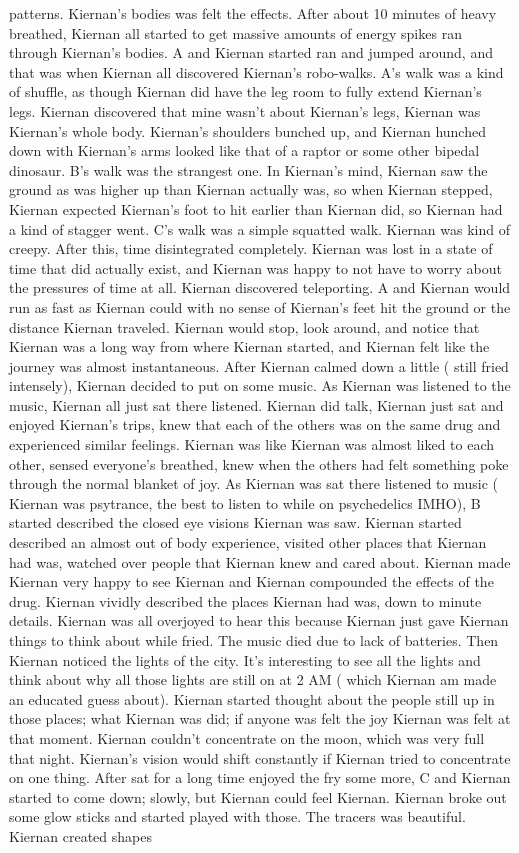 \documentclass[12pt]{book}
\begin{document}
patterns. Kiernan's bodies was felt the effects. After about 10 minutes of heavy breathed, Kiernan all started to get massive amounts of energy spikes ran through Kiernan's bodies. A and Kiernan started ran and jumped around, and that was when Kiernan all discovered Kiernan's robo-walks. A's walk was a kind of shuffle, as though Kiernan did have the leg room to fully extend Kiernan's legs. Kiernan discovered that mine wasn't about Kiernan's legs, Kiernan was Kiernan's whole body. Kiernan's shoulders bunched up, and Kiernan hunched down with Kiernan's arms looked like that of a raptor or some other bipedal dinosaur. B's walk was the strangest one. In Kiernan's mind, Kiernan saw the ground as was higher up than Kiernan actually was, so when Kiernan stepped, Kiernan expected Kiernan's foot to hit earlier than Kiernan did, so Kiernan had a kind of stagger went. C's walk was a simple squatted walk. Kiernan was kind of creepy. After this, time disintegrated completely. Kiernan was lost in a state of time that did actually exist, and Kiernan was happy to not have to worry about the pressures of time at all. Kiernan discovered teleporting. A and Kiernan would run as fast as Kiernan could with no sense of Kiernan's feet hit the ground or the distance Kiernan traveled. Kiernan would stop, look around, and notice that Kiernan was a long way from where Kiernan started, and Kiernan felt like the journey was almost instantaneous. After Kiernan calmed down a little ( still fried intensely), Kiernan decided to put on some music. As Kiernan was listened to the music, Kiernan all just sat there listened. Kiernan did talk, Kiernan just sat and enjoyed Kiernan's trips, knew that each of the others was on the same drug and experienced similar feelings. Kiernan was like Kiernan was almost liked to each other, sensed everyone's breathed, knew when the others had felt something poke through the normal blanket of joy. As Kiernan was sat there listened to music ( Kiernan was psytrance, the best to listen to while on psychedelics IMHO), B started described the closed eye visions Kiernan was saw. Kiernan started described an almost out of body experience, visited other places that Kiernan had was, watched over people that Kiernan knew and cared about. Kiernan made Kiernan very happy to see Kiernan and Kiernan compounded the effects of the drug. Kiernan vividly described the places Kiernan had was, down to minute details. Kiernan was all overjoyed to hear this because Kiernan just gave Kiernan things to think about while fried. The music died due to lack of batteries. Then Kiernan noticed the lights of the city. It's interesting to see all the lights and think about why all those lights are still on at 2 AM ( which Kiernan am made an educated guess about). Kiernan started thought about the people still up in those places; what Kiernan was did; if anyone was felt the joy Kiernan was felt at that moment. Kiernan couldn't concentrate on the moon, which was very full that night. Kiernan's vision would shift constantly if Kiernan tried to concentrate on one thing. After sat for a long time enjoyed the fry some more, C and Kiernan started to come down; slowly, but Kiernan could feel Kiernan. Kiernan broke out some glow sticks and started played with those. The tracers was beautiful. Kiernan created shapes 
\end{document}
